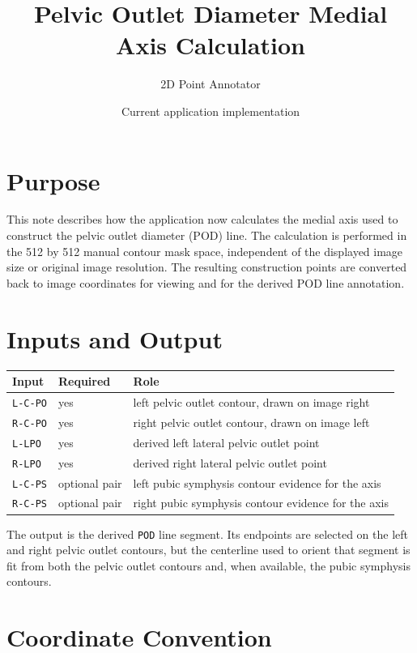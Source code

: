 \documentclass[11pt]{article}
\title{Pelvic Outlet Diameter Medial Axis Calculation}
\author{2D Point Annotator}
\date{Current application implementation}
\begin{document}
\maketitle

\section*{Purpose}

This note describes how the application now calculates the medial axis used to
construct the pelvic outlet diameter (POD) line. The calculation is performed in
the 512 by 512 manual contour mask space, independent of the displayed image size
or original image resolution. The resulting construction points are converted
back to image coordinates for viewing and for the derived POD line annotation.

\section*{Inputs and Output}

\begin{center}
\begin{tabular}{lll}
\toprule
Input & Required & Role \\
\midrule
\texttt{L-C-PO} & yes & left pelvic outlet contour, drawn on image right \\
\texttt{R-C-PO} & yes & right pelvic outlet contour, drawn on image left \\
\texttt{L-LPO} & yes & derived left lateral pelvic outlet point \\
\texttt{R-LPO} & yes & derived right lateral pelvic outlet point \\
\texttt{L-C-PS} & optional pair & left pubic symphysis contour evidence for the axis \\
\texttt{R-C-PS} & optional pair & right pubic symphysis contour evidence for the axis \\
\bottomrule
\end{tabular}
\end{center}

The output is the derived \texttt{POD} line segment. Its endpoints are selected
on the left and right pelvic outlet contours, but the centerline used to orient
that segment is fit from both the pelvic outlet contours and, when available, the
pubic symphysis contours.

\section*{Coordinate Convention}
\end{document}
